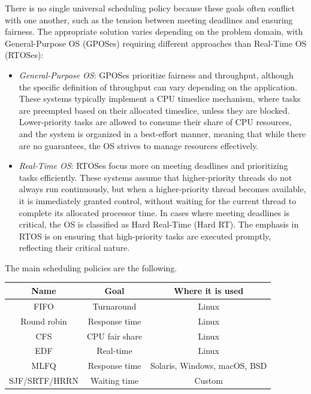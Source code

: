 There is no single universal scheduling policy because these goals often conflict with one another, such as the tension between meeting deadlines and ensuring fairness. 
The appropriate solution varies depending on the problem domain, with General-Purpose OS (GPOSes) requiring different approaches than Real-Time OS (RTOSes): 
\begin{itemize}
    \item \textit{General-Purpose OS}: GPOSes prioritize fairness and throughput, although the specific definition of throughput can vary depending on the application. 
        These systems typically implement a CPU timeslice mechanism, where tasks are preempted based on their allocated timeslice, unless they are blocked. 
        Lower-priority tasks are allowed to consume their share of CPU resources, and the system is organized in a best-effort manner, meaning that while there are no guarantees, the OS strives to manage resources effectively.
    \item \textit{Real-Time OS}: RTOSes focus more on meeting deadlines and prioritizing tasks efficiently. 
        These systems assume that higher-priority threads do not always run continuously, but when a higher-priority thread becomes available, it is immediately granted control, without waiting for the current thread to complete its allocated processor time. 
        In cases where meeting deadlines is critical, the OS is classified as Hard Real-Time (Hard RT). 
        The emphasis in RTOS is on ensuring that high-priority tasks are executed promptly, reflecting their critical nature.
\end{itemize}
The main scheduling policies are the following. 
\begin{table}[H]
    \centering
    \begin{tabular}{|c|c|c|}
    \hline
    \textbf{Name} & \textbf{Goal}  & \textbf{Where it is used}    \\ \hline
    FIFO          & Turnaround     & Linux                        \\
    Round robin   & Response time  & Linux                        \\
    CFS           & CPU fair share & Linux                        \\
    EDF           & Real-time      & Linux                        \\
    MLFQ          & Response time  & Solaris, Windows, macOS, BSD \\
    SJF/SRTF/HRRN & Waiting time   & Custom                       \\ \hline
    \end{tabular}
\end{table}





